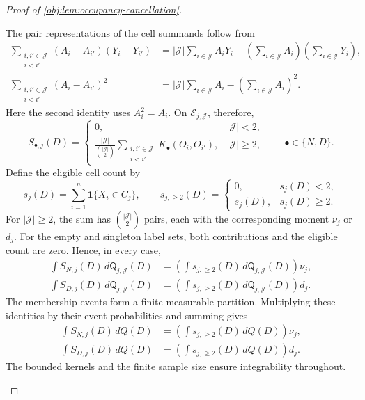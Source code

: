 \documentclass[11pt]{article}
\begin{document}
\begin{proof}[Proof of \cref{obj:lem:occupancy-cancellation}]
\begin{enumerate}
The pair representations of the cell summands follow from
\[
\begin{aligned}
\sum_{\substack{i,i'\in\mathcal J\\i<i'}}
 (A_i-A_{i'})(Y_i-Y_{i'})
&=
|\mathcal J|\sum_{i\in\mathcal J}A_iY_i
-\left(\sum_{i\in\mathcal J}A_i\right)
 \left(\sum_{i\in\mathcal J}Y_i\right),\\
\sum_{\substack{i,i'\in\mathcal J\\i<i'}}
 (A_i-A_{i'})^2
&=
|\mathcal J|\sum_{i\in\mathcal J}A_i
-\left(\sum_{i\in\mathcal J}A_i\right)^2.
\end{aligned}
\]
Here the second identity uses \(A_i^2=A_i\). On
\(\mathcal E_{j,\mathcal J}\), therefore,
\[
S_{\bullet,j}(D)=
\begin{cases}
0,&|\mathcal J|<2,\\[3pt]
\displaystyle
\frac{|\mathcal J|}{\binom{|\mathcal J|}{2}}
\sum_{\substack{i,i'\in\mathcal J\\i<i'}}
K_\bullet(O_i,O_{i'}),&|\mathcal J|\ge2,
\end{cases}
\qquad \bullet\in\{N,D\}.
\]
Define the eligible cell count by
\[
s_j(D)=\sum_{i=1}^n\mathbf1\{X_i\in C_j\},
\qquad
s_{j,\ge2}(D)=
\begin{cases}
0,&s_j(D)<2,\\
s_j(D),&s_j(D)\ge2.
\end{cases}
\]
For \(|\mathcal J|\ge2\), the sum has
\(\binom{|\mathcal J|}{2}\) pairs, each with the corresponding moment
\(\nu_j\) or \(d_j\). For the empty and singleton label sets, both contributions and the eligible count are zero. Hence, in every case,
\[
\begin{aligned}
\int S_{N,j}(D)\,d\mathsf Q_{j,\mathcal J}(D)
&=
\left(\int s_{j,\ge2}(D)\,
 d\mathsf Q_{j,\mathcal J}(D)\right)\nu_j,\\
\int S_{D,j}(D)\,d\mathsf Q_{j,\mathcal J}(D)
&=
\left(\int s_{j,\ge2}(D)\,
 d\mathsf Q_{j,\mathcal J}(D)\right)d_j.
\end{aligned}
\]
The membership events form a finite measurable partition. Multiplying these identities by their event probabilities and summing gives
\[
\begin{aligned}
\int S_{N,j}(D)\,dQ(D)
&=\left(\int s_{j,\ge2}(D)\,dQ(D)\right)\nu_j,\\
\int S_{D,j}(D)\,dQ(D)
&=\left(\int s_{j,\ge2}(D)\,dQ(D)\right)d_j.
\end{aligned}
\]
The bounded kernels and the finite sample size ensure integrability throughout.


\end{enumerate}
\end{proof}
\end{document}
